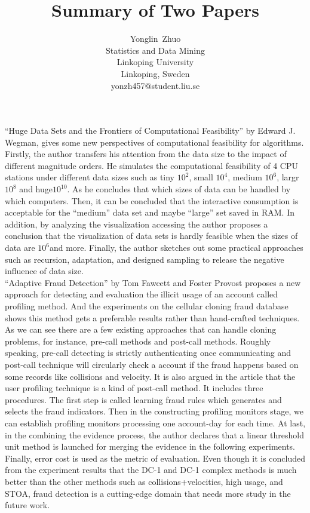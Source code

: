 \documentclass[11pt,onecolumn]{IEEEtran}
\begin{document}
\linespread{1.5}
\title{Summary of Two Papers}
\author{Yonglin~Zhuo\\
  Statistics and Data Mining\\
  Linkoping University\\
  Linkoping, Sweden\\
  yonzh457@student.liu.se}
\maketitle


\IEEEpeerreviewmaketitle

``Huge Data Sets and the Frontiers of Computational Feasibility'' by Edward J. Wegman\cite{hugedata}, gives some new perspectives of computational feasibility for algorithms. Firstly, the author transfers his attention from the data size to the impact of different magnitude orders. He simulates the computational feasibility of 4 CPU stations under different data sizes such as tiny $10^2$, small $10^4$, medium $10^6$, largr$10^8$ and huge$10^{10}$. As he concludes that which sizes of data can be handled by which computers. Then, it can be concluded that the interactive consumption is acceptable for the ``medium” data set and maybe ``large'' set saved in RAM. In addition, by analyzing the visualization accessing the author proposes a conclusion that the visualization of data sets is hardly feasible when the sizes of data are $10^6$and more. Finally, the author sketches out some practical approaches such as recursion, adaptation, and designed sampling to release the negative inﬂuence of data size.\\

``Adaptive Fraud Detection'' by Tom Fawcett and Foster Provost\cite{Fraud} proposes a new approach for detecting and evaluation the illicit usage of an account called proﬁling method. And the experiments on the cellular cloning fraud database shows this method gets a preferable results rather than hand-crafted techniques. As we can see there are a few existing approaches that can handle cloning problems, for instance, pre-call methods and post-call methods\cite{Fraud}. Roughly speaking, pre-call detecting is strictly authenticating once communicating and post-call technique will circularly check a account if the fraud happens based on some records like collisions and velocity. It is also argued in the article that the user proﬁling technique\cite{Fraud} is a kind of post-call method. It includes three procedures. The ﬁrst step is called learning fraud rules\cite{Fraud} which generates and selects the fraud indicators. Then in the constructing proﬁling monitors stage, we can establish proﬁling monitors processing one account-day for each time. At last, in the combining the evidence process, the author declares that a linear threshold unit method is launched for merging the evidence in the following experiments. Finally, error cost is used as the metric of evaluation. Even though it is concluded from the experiment results that the DC-1 and DC-1 complex methods is much better than the other methods such as collisions+velocities, high usage, and STOA\cite{Fraud}, fraud detection is a cutting-edge domain that needs more study in the future work.
\ifCLASSOPTIONcaptionsoff
  \newpage
\fi


\renewcommand\refname{Reference}
\small


\end{document}
